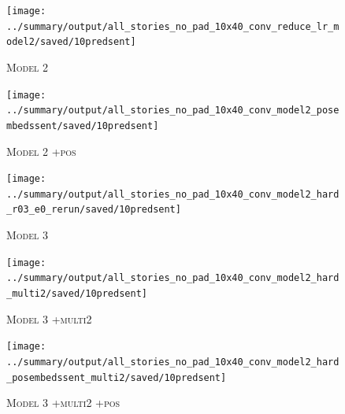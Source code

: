 \documentclass[12pt]{report}
\begin{document}
\begin{appendices}
\begin{figure}[p]
\centering
\texttt{[image: ../summary/output/all\_stories\_no\_pad\_10x40\_conv\_reduce\_lr\_model2/saved/10predsent]}
\caption[\textsc{Model 2} Attention]{\textsc{Model 2}}
\end{figure}

\begin{figure}[p]
\centering
\texttt{[image: ../summary/output/all\_stories\_no\_pad\_10x40\_conv\_model2\_posembedssent/saved/10predsent]}
\caption[\textsc{Model 2 +pos} Attention]{\textsc{Model 2 +pos}}
\end{figure}

\begin{figure}[p]
\centering
\texttt{[image: ../summary/output/all\_stories\_no\_pad\_10x40\_conv\_model2\_hard\_r03\_e0\_rerun/saved/10predsent]}
\caption[\textsc{Model 3} Attention]{\textsc{Model 3}}
\end{figure}

\begin{figure}[p]
\centering
\texttt{[image: ../summary/output/all\_stories\_no\_pad\_10x40\_conv\_model2\_hard\_multi2/saved/10predsent]}
\caption[\textsc{Model 3 +multi2} Attention]{\textsc{Model 3 +multi2}}
\end{figure}

\begin{figure}[p]
\centering
\texttt{[image: ../summary/output/all\_stories\_no\_pad\_10x40\_conv\_model2\_hard\_posembedssent\_multi2/saved/10predsent]}
\caption[\textsc{Model 3 +multi2 +pos} Attention]{\textsc{Model 3 +multi2 +pos}}
\end{figure}

\end{appendices}
\end{document}

